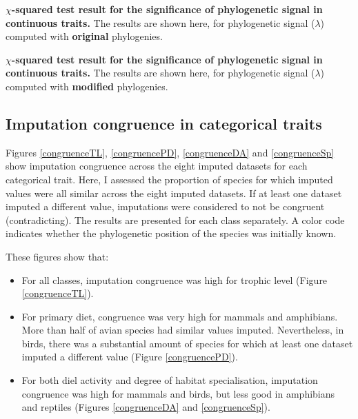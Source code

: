 \documentclass[11pt]{article}
\begin{document}
\pagebreak
\begin{table}[h!]
\renewcommand{\baselinestretch}{1}
\renewcommand{\arraystretch}{1.2}
\begin{center}\fontsize{9}{11}\selectfont
\caption[$\chi$-squared test results for the significance of phylogenetic signal in continuous traits]{\textbf{$\chi$-squared test result for the significance of phylogenetic signal in continuous traits.} The results are shown here, for phylogenetic signal ($\lambda$) computed with \textbf{original} phylogenies.}
\end{center}
\end{table}

\pagebreak
\begin{table}[h!]
\renewcommand{\baselinestretch}{1}
\renewcommand{\arraystretch}{1.2}
\begin{center}\fontsize{9}{11}\selectfont
\caption[$\chi$-squared test results for the significance of phylogenetic signal in continuous traits]{\textbf{$\chi$-squared test result for the significance of phylogenetic signal in continuous traits.} The results are shown here, for phylogenetic signal ($\lambda$) computed with \textbf{modified} phylogenies.}
\end{center}
\end{table}



\pagebreak
\subsection{Imputation congruence in categorical traits}
Figures \ref{congruenceTL}, \ref{congruencePD}, \ref{congruenceDA} and \ref{congruenceSp} show imputation congruence across the eight imputed datasets for each categorical trait. Here, I assessed the proportion of species for which imputed values were all similar across the eight imputed datasets. If at least one dataset imputed a different value, imputations were considered to not be congruent (contradicting). The results are presented for each class separately. A color code indicates whether the phylogenetic position of the species was initially known.

These figures show that:
\begin{itemize}
\item For all classes, imputation congruence was high for trophic level (Figure \ref{congruenceTL}).
\item For primary diet, congruence was very high for mammals and amphibians. More than half of avian species had similar values imputed. Nevertheless, in birds, there was a substantial amount of species for which at least one dataset imputed a different value (Figure \ref{congruencePD}).
\item For both diel activity and degree of habitat specialisation, imputation congruence was high for mammals and birds, but less good in amphibians and reptiles (Figures \ref{congruenceDA} and \ref{congruenceSp}).
\end{itemize}
\end{document}
